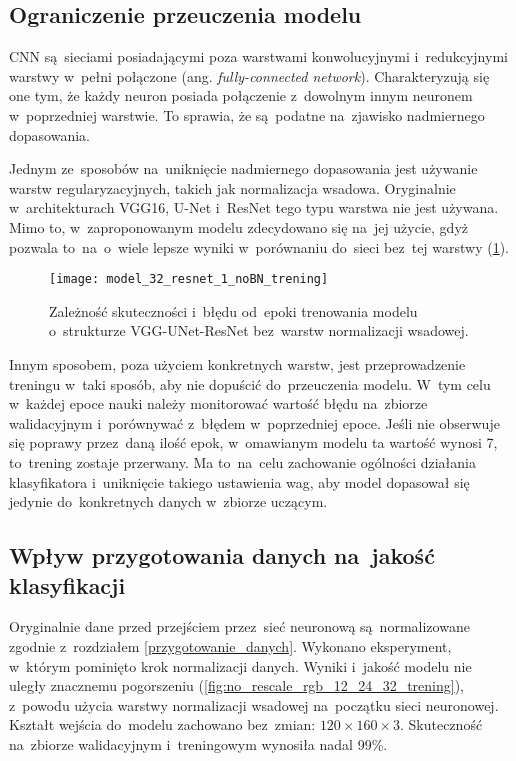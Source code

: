 \subsection{Ograniczenie przeuczenia modelu}
CNN są~sieciami posiadającymi poza warstwami konwolucyjnymi i~redukcyjnymi warstwy w~pełni połączone (ang. \textit{fully-connected network}). Charakteryzują się one tym, że każdy neuron posiada połączenie z~dowolnym innym neuronem w~poprzedniej warstwie. To sprawia, że są~podatne na~zjawisko nadmiernego dopasowania. 

{\parindent0pt
Jednym ze~sposobów na~uniknięcie nadmiernego dopasowania jest używanie warstw regularyzacyjnych, takich jak normalizacja wsadowa. Oryginalnie w~architekturach VGG16, U-Net i~ResNet tego typu warstwa nie jest używana. Mimo to, w~zaproponowanym modelu zdecydowano się na~jej użycie, gdyż pozwala to~na~o~wiele lepsze wyniki w~porównaniu do~sieci bez~tej warstwy (\ref{fig:model_32_resnet_1_noBN_trening}).

\begin{figure}[h!]
	\centering
	\centering
		\texttt{[image: model\_32\_resnet\_1\_noBN\_trening]}	
	\caption{Zależność skuteczności i~błędu od~epoki trenowania modelu o~strukturze VGG-UNet-ResNet bez~warstw normalizacji wsadowej.}	\label{fig:model_32_resnet_1_noBN_trening}
\end{figure}

Innym sposobem, poza użyciem konkretnych warstw, jest przeprowadzenie treningu w~taki sposób, aby nie dopuścić do~przeuczenia modelu. W~tym celu w~każdej epoce nauki należy monitorować wartość błędu na~zbiorze walidacyjnym i~porównywać z~błędem w~poprzedniej epoce. Jeśli nie obserwuje się poprawy przez~daną ilość epok, w~omawianym modelu ta wartość wynosi 7, to~trening zostaje przerwany. Ma to~na~celu zachowanie ogólności działania klasyfikatora i~uniknięcie takiego ustawienia wag, aby model dopasował się jedynie do~konkretnych danych w~zbiorze uczącym. 
}

\subsection{Wpływ przygotowania danych na~jakość klasyfikacji}

Oryginalnie dane przed przejściem przez~sieć neuronową są~normalizowane zgodnie z~rozdziałem \ref{przygotowanie_danych}. Wykonano eksperyment, w~którym pominięto krok normalizacji danych. Wyniki i~jakość modelu nie uległy znacznemu pogorszeniu (\ref{fig:no_rescale_rgb_12_24_32_trening}), z~powodu użycia warstwy normalizacji wsadowej na~początku sieci neuronowej. Kształt wejścia do~modelu zachowano bez~zmian: $120\times160\times3$. Skuteczność na~zbiorze walidacyjnym i~treningowym wynosiła nadal 99\%.

